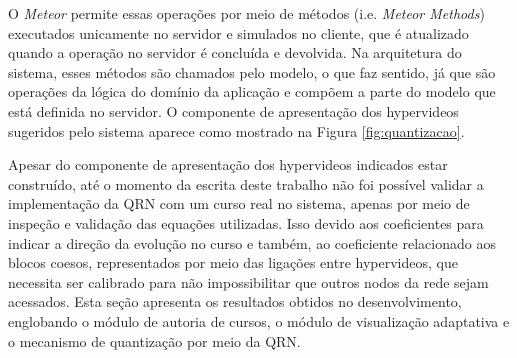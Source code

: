 O \textit{Meteor} permite essas operações por meio de métodos (i.e. \textit{Meteor Methods}) executados unicamente no servidor e simulados no cliente, que é atualizado quando a operação no servidor é concluída e devolvida. Na arquitetura do sistema, esses métodos são chamados pelo modelo, o que faz sentido, já que são operações da lógica do domínio da aplicação e compõem a parte do modelo que está definida no servidor. O componente de apresentação dos hypervideos sugeridos pelo sistema aparece como mostrado na Figura \ref{fig:quantizacao}.

Apesar do componente de apresentação dos hypervideos indicados estar construído, até o momento da escrita deste trabalho não foi possível validar a implementação da QRN com um curso real no sistema, apenas por meio de inspeção e validação das equações utilizadas. Isso devido aos coeficientes para indicar a direção da evolução no curso e também, ao coeficiente relacionado aos blocos coesos, representados por meio das ligações entre hypervideos, que necessita ser calibrado para não impossibilitar que outros nodos da rede sejam acessados.
Esta seção apresenta os resultados obtidos no desenvolvimento, englobando o módulo de autoria de cursos, o módulo de visualização adaptativa e o mecanismo de quantização por meio da QRN.